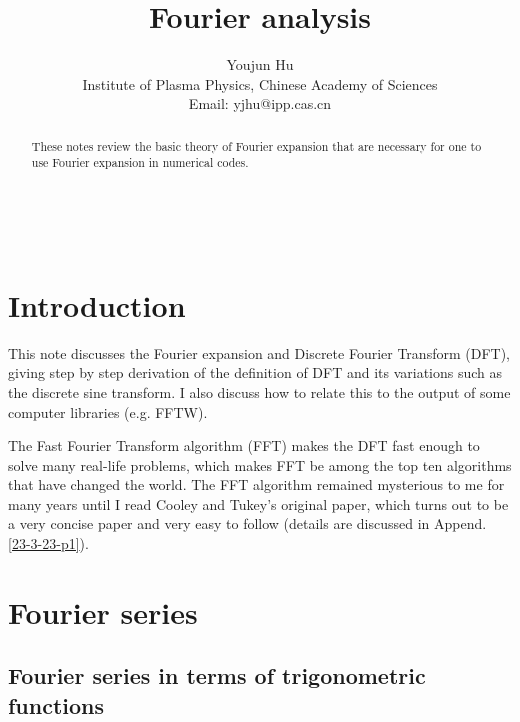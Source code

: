 \documentclass{article}
\newcommand{\tmaffiliation}[1]{\\ #1}
\begin{document}
\

\title{Fourier analysis}

\author{
  Youjun Hu
  \tmaffiliation{Institute of Plasma Physics, Chinese Academy of Sciences\\
  Email: yjhu@ipp.cas.cn}
}

\maketitle

\begin{abstract}
  These notes review the basic theory of Fourier expansion that are necessary
  for one to use Fourier expansion in numerical codes.
\end{abstract}

\section{Introduction}

This note discusses the Fourier expansion and Discrete Fourier Transform
(DFT), giving step by step derivation of the definition of DFT and its
variations such as the discrete sine transform. I also discuss how to relate
this to the output of some computer libraries (e.g. FFTW).

The Fast Fourier Transform algorithm (FFT) makes the DFT fast enough to solve
many real-life problems, which makes FFT be among the top ten algorithms that
have changed the world. The FFT algorithm remained mysterious to me for many
years until I read Cooley and Tukey's original paper, which turns out to be a
very concise paper and very easy to follow (details are discussed in Append.
\ref{23-3-23-p1}).

\section{Fourier series}

\subsection{Fourier series in terms of trigonometric functions}
\end{document}

